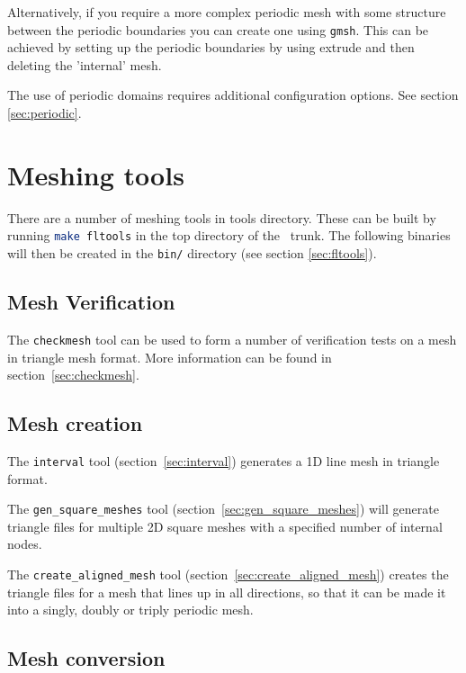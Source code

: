 Alternatively, if you require a more complex periodic mesh with some structure between the periodic 
boundaries you can create one using \lstinline[language=Bash]{gmsh}. This can be achieved by 
setting up the periodic boundaries by using extrude and then deleting the 'internal' mesh.

The use of periodic domains requires additional configuration options. See
section \ref{sec:periodic}.

\section{Meshing tools}
\label{sec:meshing_tools}

There are a number of meshing tools in tools directory. These can be built by running 
\lstinline[language = bash]+make fltools+ in the top directory of the \fluidity\ trunk.
The following binaries will then be created in the \lstinline+bin/+ directory (see section \ref{sec:fltools}).

\subsection{Mesh Verification}

The \lstinline[language = Bash]+checkmesh+ tool can be used to form a number of verification tests on a mesh
in triangle mesh format. More information can be found in section~\ref{sec:checkmesh}.

\subsection{Mesh creation}
The \lstinline[language = bash]+interval+ tool (section~\ref{sec:interval}) generates a 1D line mesh in triangle format. 

The \lstinline[language = bash]+gen_square_meshes+ tool (section~\ref{sec:gen_square_meshes})  will generate triangle files for multiple 2D square meshes with a specified number of internal nodes.

The \lstinline[language = bash]+create_aligned_mesh+ tool (section~\ref{sec:create_aligned_mesh}) creates the triangle files for a mesh that lines up in all directions, so that it can be made it into a singly, doubly or triply periodic mesh.

\subsection{Mesh conversion}


